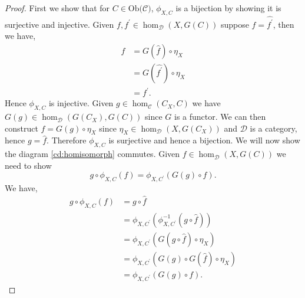 \documentclass[11pt,a4paper]{article}
\theoremstyle{definition}
\newcommand\ho[3][]{\hom_{#1}(#2,#3)}
\newcommand\ob[1]{\mathrm{Ob(}#1\mathrm{)}}
\newcommand\cat[1]{\mathscr{#1}}
\numberwithin{equation}{section}
\begin{document}
\begin{proof}
    First we show that for $C\in\ob{\cat{C}}$, $\phi_{X,C}$ is a bijection by showing it is surjective and injective. Given $f,f^\prime\in\ho[\cat{D}]{X}{G(C)}$ suppose $\hat{f}=\hat{f^\prime}$,  then we have,
    \begin{align*}
        f &= G(\hat{f})\circ \eta_{X}\\
        &= G(\hat{f^\prime})\circ\eta_{X}\\
        &= f^{\prime}.
    \end{align*}
    Hence $\phi_{X,C}$ is injective. Given $g \in\ho[\cat{C}]{C_{X}}{C}$ we have $G(g)\in\ho[\cat{D}]{G(C_{X})}{G(C)}$ since $G$ is a functor. We can then construct $f=G(g)\circ\eta_{X}$ since $\eta_{X}\in\ho[\cat{D}]{X}{G(C_{X})}$ and $\cat{D}$ is a category, hence $g=\hat{f}$. Therefore $\phi_{X,C}$ is surjective and hence a bijection. We will now show the diagram \eqref{cd:homisomorph} commutes. Given $f\in\ho[\cat{D}]{X}{G(C)}$ we need to show
    \[g\circ\phi_{X,C}(f) = \phi_{X,C^\prime}(G(g)\circ f).\]
    We have,
    \begin{align*}
        g\circ\phi_{X,C}(f) &= g\circ \hat{f}\\
        &= \phi_{X,C^\prime}(\phi_{X,C^\prime}^{-1}(g\circ \hat{f}))\\
        &= \phi_{X,C^\prime}(G(g\circ \hat{f})\circ\eta_{X})\\
        &= \phi_{X,C^\prime}(G(g)\circ G(\hat{f})\circ\eta_{X})\\
        &= \phi_{X,C^\prime}(G(g)\circ f).
    \end{align*}
\end{proof}

\end{document}
